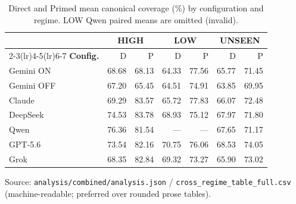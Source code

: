 \begin{table}[t]
\centering
\caption{Direct and Primed mean canonical coverage (\%) by configuration and regime.
LOW Qwen paired means are omitted (invalid).}
\label{tab:dpmeans}
\scriptsize
\begin{tabular}{@{}lrrrrrr@{}}
\toprule
 & \multicolumn{2}{c}{\textbf{HIGH}} & \multicolumn{2}{c}{\textbf{LOW}} & \multicolumn{2}{c}{\textbf{UNSEEN}} \\
\cmidrule(lr){2-3}\cmidrule(lr){4-5}\cmidrule(lr){6-7}
\textbf{Config.} & D & P & D & P & D & P \\
\midrule
Gemini ON & 68.68 & 68.13 & 64.33 & 77.56 & 65.77 & 71.45 \\
Gemini OFF & 67.20 & 65.45 & 64.51 & 74.91 & 63.85 & 69.95 \\
Claude & 69.29 & 83.57 & 65.72 & 77.83 & 66.07 & 72.48 \\
DeepSeek & 74.53 & 83.78 & 68.93 & 75.12 & 67.97 & 71.80 \\
Qwen & 76.36 & 81.54 & --- & --- & 67.65 & 71.17 \\
GPT-5.6 & 73.54 & 82.16 & 70.75 & 76.06 & 68.53 & 74.05 \\
Grok & 68.35 & 82.84 & 69.32 & 73.27 & 65.90 & 73.02 \\
\bottomrule
\end{tabular}
\begin{flushleft}
\footnotesize
Source: \texttt{analysis/combined/analysis.json} / \texttt{cross\_regime\_table\_full.csv}
(machine-readable; preferred over rounded prose tables).
\end{flushleft}
\end{table}
